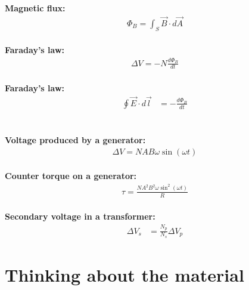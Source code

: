 \begin{importantEquations}
\begin{multicols}{2}
\textbf{Magnetic flux:}
\begin{align*}
\Phi_B = \int_S \vec B\cdot d\vec A
\end{align*}
\\
\textbf{Faraday's law:}
\begin{align*}
\Delta V = -N\frac{d\Phi_B}{dt}
\end{align*}
\\
\textbf{Faraday's law:}
\begin{align*}
\oint \vec E\cdot d\vec l &= -\frac{d\Phi_B}{dt}
\end{align*}
\\
\columnbreak
\\
\textbf{Voltage produced by a generator:}
\begin{align*}
\Delta V = NAB\omega\sin(\omega t)
\end{align*}
\\
\textbf{Counter torque on a generator:}
\begin{align*}
\tau = \frac{NA^2B^2\omega\sin^2(\omega t)}{R}
\end{align*}
\\
\textbf{Secondary voltage in a transformer:}
\begin{align*}
\Delta V_s &= \frac{N_p}{N_s}\Delta V_p
\end{align*}
\end{multicols}
\end{importantEquations}

\newpage
\section{Thinking about the material}

